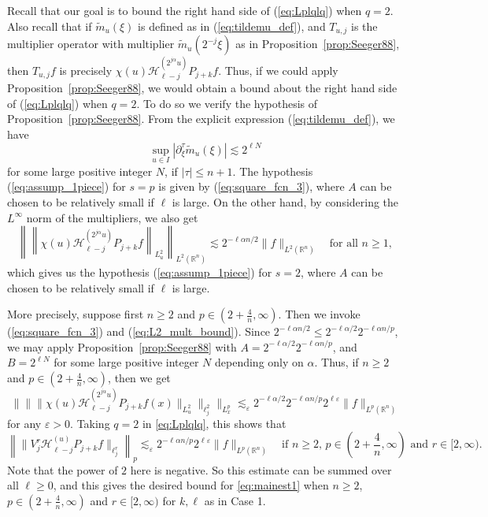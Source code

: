 \documentclass[12pt,leqno]{amsart}
\def\R{\mathbb{R}}
\theoremstyle{plain}
\numberwithin{equation}{section}
\begin{document}
Recall that our goal is to bound the right hand side of (\ref{eq:Lplqlq}) when $q = 2$. Also recall that if $\tilde{m}_u(\xi)$ is defined as in (\ref{eq:tildemu_def}), and $T_{u,j}$ is the multiplier operator with multiplier $\tilde{m}_u(2^{-j}\xi)$ as in Proposition~\ref{prop:Seeger88}, then $T_{u,j}f$ is precisely $\chi(u) \mathcal{H}^{(2^{j \alpha} u)}_{\ell-j} P_{j+k} f$. Thus, if we could apply Proposition~\ref{prop:Seeger88}, we would obtain a bound about the right hand side of (\ref{eq:Lplqlq}) when $q = 2$. To do so we verify the hypothesis of Proposition~\ref{prop:Seeger88}. From the explicit expression (\ref{eq:tildemu_def}), we have $$\sup_{u \in I} |\partial_{\xi}^{\tau} \tilde{m}_u(\xi)| \lesssim 2^{\ell N}$$ for some large positive integer $N$, if $|\tau| \leq n+1$. The hypothesis (\ref{eq:assump_1piece}) for $s = p$ is given by (\ref{eq:square_fcn_3}), where $A$ can be chosen to be relatively small if $\ell$ is large. On the other hand, by considering the $L^{\infty}$ norm of the multipliers, we also get
\begin{equation} \label{eq:L2_mult_bound}
\left\|  \left\|  \chi(u) \mathcal{H}^{(2^{j \alpha} u)}_{\ell-j} P_{j+k} f \right\|_{L^2_u} \right\|_{L^2(\R^n)} \lesssim 
2^{-\ell \alpha n/2} \|f\|_{L^2(\R^n)} \quad \text{for all $n \geq 1$},
\end{equation}
which gives us the hypothesis (\ref{eq:assump_1piece}) for $s = 2$, where $A$ can be chosen to be relatively small if $\ell$ is large.

More precisely, suppose first $n \geq 2$ and $p \in (2+\frac{4}{n},\infty)$. Then we invoke (\ref{eq:square_fcn_3}) and (\ref{eq:L2_mult_bound}). Since $2^{-\ell \alpha n/2} \leq 2^{-\ell \alpha/2} 2^{-\ell \alpha n/p}$, we may apply Proposition~\ref{prop:Seeger88} with $A = 2^{-\ell \alpha/2} 2^{-\ell \alpha n/p} $, and $B = 2^{\ell N}$ for some large positive integer $N$ depending only on $\alpha$. Thus, if $n \geq 2$ and $p \in (2+\frac{4}{n},\infty)$, then we get
\[
\| \| \| \chi(u) \mathcal{H}^{(2^{j \alpha} u)}_{\ell-j} P_{j+k} f (x) \|_{L^2_u} \|_{\ell^2_j} \|_{L^p_x} \lesssim_{\varepsilon} 
2^{-\ell \alpha/2} 2^{-\ell \alpha n/p}  2^{\ell \varepsilon} \|f\|_{L^p(\R^n)} 
\]
for any $\varepsilon > 0$. Taking $q = 2$ in \eqref{eq:Lplqlq}, this shows that
\[
\left\| \|V_j^{r} \mathcal{H}^{(u)}_{\ell-j} P_{j+k} f \|_{\ell^r_j} \right\|_p  \lesssim_{\varepsilon} 2^{-\ell \alpha n/p} 2^{\ell \varepsilon} \|f\|_{L^p(\R^n)} \quad \text{if $n \geq 2$, $p \in (2+\frac{4}{n},\infty)$ and $r \in [2, \infty)$.}
\]
Note that the power of $2$ here is negative. So this estimate can be summed over all $\ell \geq 0$, and this gives the desired bound for \eqref{eq:mainest1} when $n \geq 2$, $p \in (2+\frac{4}{n},\infty)$ and $r \in [2,\infty)$ for $k, \ell$ as in Case 1.
\end{document}
